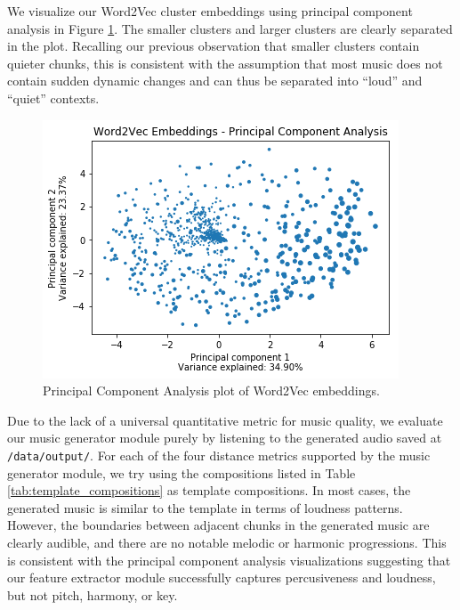 \documentclass{article}
\begin{document}
We visualize our Word2Vec cluster embeddings using principal component analysis in Figure \ref{fig:word2vec_pca}. The smaller clusters and larger clusters are clearly separated in the plot. Recalling our previous observation that smaller clusters contain quieter chunks, this is consistent with the assumption that most music does not contain sudden dynamic changes and can thus be separated into ``loud'' and ``quiet'' contexts.

\begin{figure}
    \centering
    \includegraphics[width=0.67 \linewidth]{word2vec_pca.png}
    \caption{Principal Component Analysis plot of Word2Vec embeddings.}
    \label{fig:word2vec_pca}
\end{figure}

Due to the lack of a universal quantitative metric for music quality, we evaluate our music generator module purely by listening to the generated audio saved at \texttt{/data/output/}. For each of the four distance metrics supported by the music generator module, we try using the compositions listed in Table \ref{tab:template_compositions} as template compositions. In most cases, the generated music is similar to the template in terms of loudness patterns. However, the boundaries between adjacent chunks in the generated music are clearly audible, and there are no notable melodic or harmonic progressions. This is consistent with the principal component analysis visualizations suggesting that our feature extractor module successfully captures percusiveness and loudness, but not pitch, harmony, or key.
\end{document}
